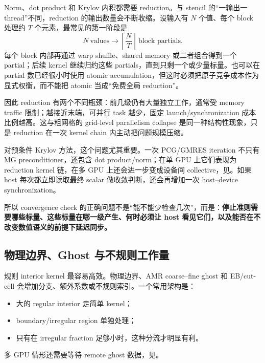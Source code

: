 Norm、dot product 和 Krylov 内积都需要 reduction。与 stencil 的“一输出一 thread”不同，reduction 的输出数量会不断收缩。设输入有 $N$ 个值、每个 block 处理约 $T$ 个元素，最常见的第一阶段是
\[
N\ \text{values}
\longrightarrow
\left\lceil\frac{N}{T}\right\rceil\ \text{block partials}.
\]
每个 block 内部再通过 warp shuffle、shared memory 或二者组合得到一个 partial；后续 kernel 继续归约这些 partials，直到只剩一个或少量标量。也可以在 partial 数已经很小时使用 atomic accumulation，但这时必须把原子竞争成本作为显式权衡，而不能把 atomic 当成“免费全局 reduction”。

因此 reduction 有两个不同瓶颈：前几级仍有大量独立工作，通常受 memory traffic 限制；越接近末端，可并行 task 越少，固定 launch/synchronization 成本比例越高。这与粗网格的 grid-level parallelism collapse 是同一种结构性现象，只是 reduction 在一次 kernel chain 内主动把问题规模压缩。

对预条件 Krylov 方法，这个问题尤其重要。一次 PCG/GMRES iteration 不只有 MG preconditioner，还包含 dot product/norm；在单 GPU 上它们表现为 reduction kernel 链，在多 GPU 上还会进一步变成设备间 collective，见。如果 host 每次都立即读取最终 scalar 做收敛判断，还会再增加一次 host--device synchronization。

所以 convergence check 的正确问题不是“能不能少检查几次”，而是：\textbf{停止准则需要哪些标量、这些标量在哪一级产生、何时必须让 host 看见它们，以及能否在不改变数值语义的前提下延迟同步。}

\subsection{物理边界、Ghost 与不规则工作量}

规则 interior kernel 最容易高效。物理边界、AMR coarse--fine ghost 和 EB/cut-cell 会增加分支、额外系数或不规则索引。一个常用架构是：
\begin{itemize}
\item 大的 regular interior 走简单 kernel；
\item boundary/irregular region 单独处理；
\item 只有在 irregular fraction 足够小时，这种分流才明显有利。
\end{itemize}

多 GPU 情形还需要等待 remote ghost 数据，见。

